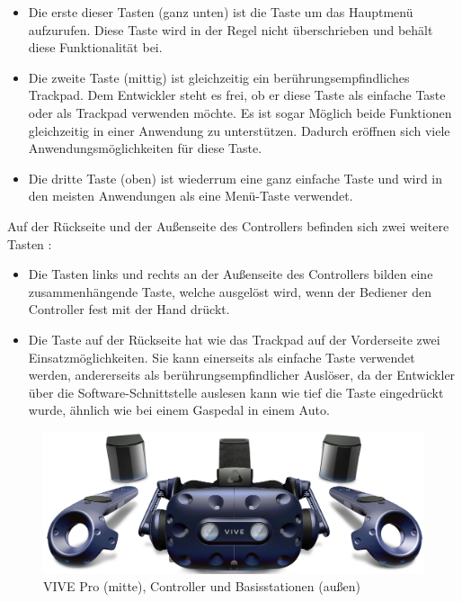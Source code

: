 \begin{itemize}
	\item Die erste dieser Tasten (ganz unten) ist die Taste um das Hauptmenü aufzurufen. Diese 
	Taste wird in der Regel nicht überschrieben und behält diese Funktionalität bei.
	\item Die zweite Taste (mittig) ist gleichzeitig ein berührungsempfindliches Trackpad. Dem 
	Entwickler steht es frei, ob er diese Taste als einfache Taste oder als Trackpad verwenden 
	möchte. Es ist sogar Möglich beide Funktionen gleichzeitig in einer Anwendung zu 
	unterstützen. Dadurch eröffnen sich viele Anwendungsmöglichkeiten für diese Taste.
	\item Die dritte Taste (oben) ist wiederrum eine ganz einfache Taste und wird in den meisten 
	Anwendungen als eine Menü-Taste verwendet.
\end{itemize}
Auf der Rückseite und der Außenseite des Controllers befinden sich zwei weitere Tasten \cite{29}:
\begin{itemize}
	\item Die Tasten links und rechts an der Außenseite des Controllers bilden eine zusammenhängende Taste, welche ausgelöst wird, wenn der Bediener den Controller fest mit der Hand drückt.
	\item Die Taste auf der Rückseite hat wie das Trackpad auf der Vorderseite zwei 
	Einsatzmöglichkeiten. Sie kann einerseits als einfache Taste verwendet werden, andererseits 
	als berührungsempfindlicher Auslöser, da der Entwickler über die Software-Schnittstelle 
	auslesen kann wie tief die Taste eingedrückt wurde, ähnlich wie bei einem Gaspedal in
	einem Auto.
\end{itemize}
\begin{figure}[h]
	\centering
	\includegraphics[width=0.6\linewidth]{Bilder/A26_Vivepro2}
	\caption{VIVE Pro (mitte), Controller und Basisstationen (außen) \cite{A26}}
	\label{fig:ViveproKit}
\end{figure}
